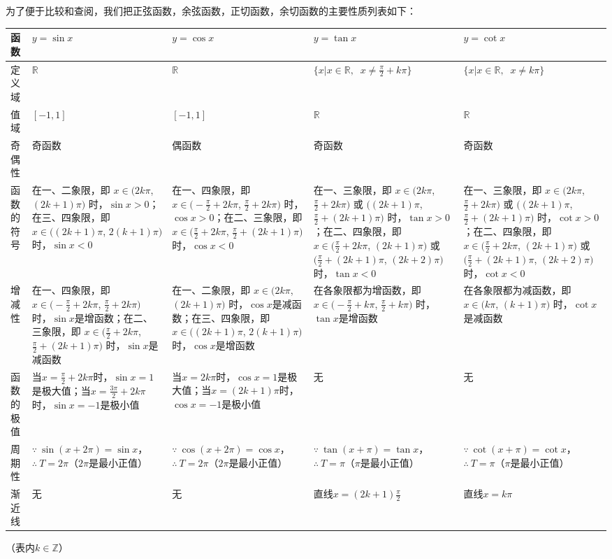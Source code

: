 为了便于比较和查阅，我们把正弦函数，余弦函数，正切函数，余切函数的主要性质列表如下：

{\small
\begin{longtable}{p{}|p{}p{}p{}p{}}
    \hline
函数 & $y=\sin x$ & $y=\cos x$    & $y=\tan x$ & $y=\cot x$\\
\hline
定义域 & $\mathbb{R}$ & $\mathbb{R}$ & $\{x|x\in \mathbb{R},\;\; x\ne\frac{\pi}{2}+k\pi\}$ & $\{x|x\in \mathbb{R},\;\; x\ne k\pi\}$\\
\hline
值域 & $[-1,1]$& $[-1,1]$& $\mathbb{R}$ &$\mathbb{R}$ \\
\hline
奇偶性 & 奇函数 &偶函数& 奇函数 &奇函数\\
\hline
函数的符号 & 在一、二象限，即 $x\in\bigl(2k\pi$, $(2k+1)\pi\bigr)$ 时，$\sin x>0$；在三、四象限，即 $x\in\bigl((2k+1)\pi$, $2(k+1)\pi\bigr)$ 时，$\sin x<0$
& 在一、四象限，即 $x\in\bigl(-\frac{\pi}{2}+2k\pi$, $\frac{\pi}{2}+2k\pi\bigr)$ 时，$\cos x>0$；在二、三象限，即 $x\in\bigl(\frac{\pi}{2}+2k\pi$, $\frac{\pi}{2}+(2k+1)\pi\bigr)$ 时，$\cos x<0$
& 在一、三象限，即 $x\in\bigl(2k\pi$, $\frac{\pi}{2}+2k\pi\bigr)$ 或 $\bigl((2k+1)\pi$, $\frac{\pi}{2}+(2k+1)\pi\bigr)$ 时，$\tan x>0$；在二、四象限，即 $x\in\bigl(\frac{\pi}{2}+2k\pi$, $(2k+1)\pi\bigr)$ 或 $\bigl(\frac{\pi}{2}+(2k+1)\pi$, $(2k+2)\pi\bigr)$ 时，$\tan x<0$
& 在一、三象限，即 $x\in\bigl(2k\pi$, $\frac{\pi}{2}+2k\pi\bigr)$ 或 $\bigl((2k+1)\pi$, $\frac{\pi}{2}+(2k+1)\pi\bigr)$ 时，$\cot x>0$；在二、四象限，即 $x\in\bigl(\frac{\pi}{2}+2k\pi$, $(2k+1)\pi\bigr)$ 或 $\bigl(\frac{\pi}{2}+(2k+1)\pi$, $(2k+2)\pi\bigr)$ 时，$\cot x<0$\\
\hline
增减性 & 在一、四象限，即 $x\in\bigl(-\frac{\pi}{2}+2k\pi$, $\frac{\pi}{2}+2k\pi\bigr)$ 时，$\sin x$是增函数；在二、三象限，即 $x\in\bigl(\frac{\pi}{2}+2k\pi$, $\frac{\pi}{2}+(2k+1)\pi\bigr)$ 时，$\sin x$是减函数
& 在一、二象限，即 $x\in\bigl(2k\pi$, $(2k+1)\pi\bigr)$ 时，$\cos x$是减函数；在三、四象限，即 $x\in\bigl((2k+1)\pi$, $2(k+1)\pi\bigr)$ 时，$\cos x$是增函数
& 在各象限都为增函数，即 $x\in\bigl(-\frac{\pi}{2}+k\pi$, $\frac{\pi}{2}+k\pi\bigr)$ 时，$\tan x$是增函数
& 在各象限都为减函数，即 $x\in\bigl(k\pi$, $(k+1)\pi\bigr)$ 时，$\cot x$是减函数 \\
\hline
函数的极值& 当$x=\frac{\pi}{2}+2k\pi$时，$\sin x=1$是极大值；当$x=\frac{3\pi}{2}+2k\pi$时，$\sin x=-1$是极小值
& 当$x=2k\pi$时，$\cos x=1$是极大值；当$x=(2k+1)\pi$时，$\cos x=-1$是极小值&无& 无\\
\hline
周期性& $\because\ \sin(x+2\pi)=\sin x$，$\therefore\ T=2\pi$（$2\pi$是最小正值）
& $\because\ \cos(x+2\pi)=\cos x$，$\therefore\ T=2\pi$（$2\pi$是最小正值）
& $\because\ \tan(x+\pi)=\tan x$，$\therefore\ T=\pi$（$\pi$是最小正值）
& $\because\ \cot(x+\pi)=\cot x$，$\therefore\ T=\pi$（$\pi$是最小正值）\\
\hline
渐近线 & 无& 无& 直线$x=(2k+1)\frac{\pi}{2}$& 直线$x=k\pi$\\
\hline
\end{longtable}
}
\vspace{-\baselineskip}
\begin{flushright}
（表内$k\in\mathbb{Z}$）
\end{flushright}

